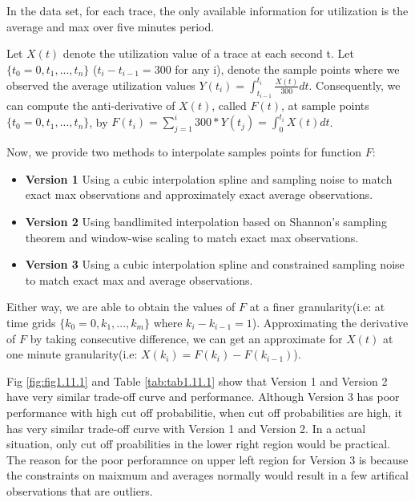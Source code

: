 \documentclass{article}
\begin{document}
\begin{flushleft}
In the data set, for each trace, the only available information for utilization
is the average and max over five minutes period. 

Let $X(t)$ denote the utilization value of a trace at each second t. Let $\{t_0
= 0,t_1,...,t_n\}$ ($t_i - t_{i-1} = 300$ for any i), denote the sample points
where we observed the average utilization values $Y(t_i) =
\int_{t_{i-1}}^{t_i}\frac{X(t)}{300}dt$. Consequently, we can compute the
anti-derivative of $X(t)$, called $F(t)$, at sample points $\{t_0 =
0,t_1,...,t_n\}$, by $F(t_i) = \sum_{j=1}^{i} 300 * Y(t_j) =
\int_{0}^{t_i}X(t)dt$. 

Now, we provide two methods to interpolate samples points for function $F$:
\begin{itemize}
    \item \textbf{Version 1} Using a cubic interpolation spline and sampling
    noise to match exact max observations and approximately exact average
    observations.
    \item \textbf{Version 2} Using bandlimited interpolation based on Shannon's
    sampling theorem and window-wise scaling to match exact max observations.
    \item \textbf{Version 3} Using a cubic interpolation spline and constrained
    sampling noise to match exact max and average observations.
\end{itemize}

Either way, we are able to obtain the values of $F$ at a finer granularity(i.e:
at time grids $\{k_0 = 0, k_1, ..., k_m\}$ where $k_i - k_{i-1} = 1$).
Approximating the derivative of $F$ by taking consecutive difference, we can get
an approximate for $X(t)$ at one minute granularity(i.e: $X(k_i) = F(k_i) -
F(k_{i-1})$).    
\end{flushleft}

\begin{flushleft}
Fig \ref{fig:fig1.11.1} and Table \ref{tab:tab1.11.1} show that Version 1 and
Version 2 have very similar trade-off curve and performance. Although Version 3
has poor performance with high cut off probabilitie, when cut off probabilities
are high, it has very similar trade-off curve with Version 1 and Version 2. In a
actual situation, only cut off proabilities in the lower right region would
be practical. The reason for the poor perforamnce on upper left region for
Version 3 is because the constraints on maixmum and averages normally would
result in a few artifical observations that are outliers. 
\end{flushleft}
\end{document}
